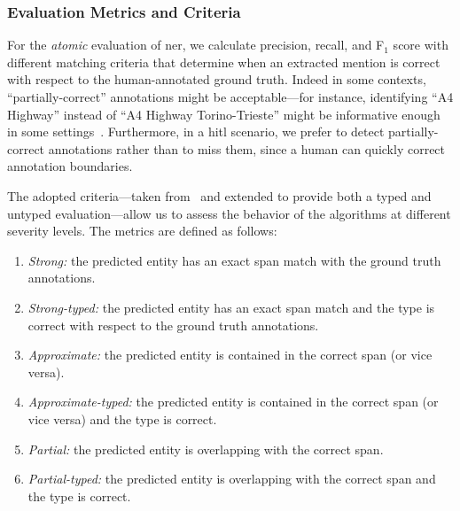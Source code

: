 \subsubsection{Evaluation Metrics and Criteria}\label{sec:metrics}
For the \textit{atomic} evaluation of \ac{ner}, we calculate precision, recall, and F$_1$ score with different matching criteria that determine when an extracted mention is correct with respect to the human-annotated ground truth.
Indeed in some contexts, ``partially-correct'' annotations might be acceptable---for instance, identifying ``A4 Highway'' instead of ``A4 Highway Torino-Trieste'' might be informative enough in some settings~\cite{nadeau2007survey, tsai2006various}. Furthermore, in a \ac{hitl} scenario, we prefer to detect partially-correct annotations rather than to miss them, since a human can quickly correct annotation boundaries.


The adopted criteria---taken from~\cite{tsai2006various} and extended to provide both a typed and untyped evaluation---allow us to assess the behavior of the algorithms at different severity levels. The metrics are defined as follows:
\begin{enumerate}
    \item \textit{Strong:} the predicted entity has an exact span match with the ground truth annotations.
    \item \textit{Strong-typed:} the predicted entity has an exact span match and the type is correct with respect to the ground truth annotations.
    \item \textit{Approximate:} the predicted entity is contained in the correct span (or vice versa).
    \item \textit{Approximate-typed:} the predicted entity is contained in the correct span (or vice versa) and the type is correct.
    \item \textit{Partial:} the predicted entity is overlapping with the correct span.
    \item \textit{Partial-typed:} the predicted entity is overlapping with the correct span and the type is correct.
\end{enumerate}

